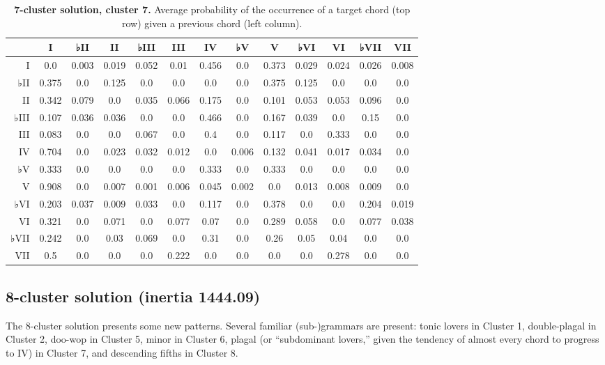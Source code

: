 \begin{table}[htbp]
\begin{minipage}{\linewidth}
\setlength{\tymax}{0.5\linewidth}
\centering
\small
\caption{\textbf{7-cluster solution, cluster 7.} Average probability of the occurrence of a target chord (top row) given a previous chord (left column).}
\label{7-clustersolutioncluster7.averageprobabilityoftheoccurrenceofatargetchordtoprowgivenapreviouschordleftcolumn.}
\begin{tabulary}{\textwidth}{@{}RCCCCCCCCCCCC@{}} \toprule
&I&♭II&II&♭III&III&IV&♭V&V&♭VI&VI&♭VII&VII\\
\midrule
I&0.0&0.003&0.019&0.052&0.01&0.456&0.0&0.373&0.029&0.024&0.026&0.008\\
♭II&0.375&0.0&0.125&0.0&0.0&0.0&0.0&0.375&0.125&0.0&0.0&0.0\\
II&0.342&0.079&0.0&0.035&0.066&0.175&0.0&0.101&0.053&0.053&0.096&0.0\\
♭III&0.107&0.036&0.036&0.0&0.0&0.466&0.0&0.167&0.039&0.0&0.15&0.0\\
III&0.083&0.0&0.0&0.067&0.0&0.4&0.0&0.117&0.0&0.333&0.0&0.0\\
IV&0.704&0.0&0.023&0.032&0.012&0.0&0.006&0.132&0.041&0.017&0.034&0.0\\
♭V&0.333&0.0&0.0&0.0&0.0&0.333&0.0&0.333&0.0&0.0&0.0&0.0\\
V&0.908&0.0&0.007&0.001&0.006&0.045&0.002&0.0&0.013&0.008&0.009&0.0\\
♭VI&0.203&0.037&0.009&0.033&0.0&0.117&0.0&0.378&0.0&0.0&0.204&0.019\\
VI&0.321&0.0&0.071&0.0&0.077&0.07&0.0&0.289&0.058&0.0&0.077&0.038\\
♭VII&0.242&0.0&0.03&0.069&0.0&0.31&0.0&0.26&0.05&0.04&0.0&0.0\\
VII&0.5&0.0&0.0&0.0&0.222&0.0&0.0&0.0&0.0&0.278&0.0&0.0\\

\bottomrule

\end{tabulary}
\end{minipage}
\end{table}

\subsection{8-cluster solution (inertia 1444.09)}
\label{8-clustersolutioninertia1444.09}

The 8-cluster solution presents some new patterns. Several familiar (sub-)grammars are present: tonic lovers in Cluster 1, double-plagal in Cluster 2, doo-wop in Cluster 5, minor in Cluster 6, plagal (or ``subdominant lovers,'' given the tendency of almost every chord to progress to IV) in Cluster 7, and descending fifths in Cluster 8.


